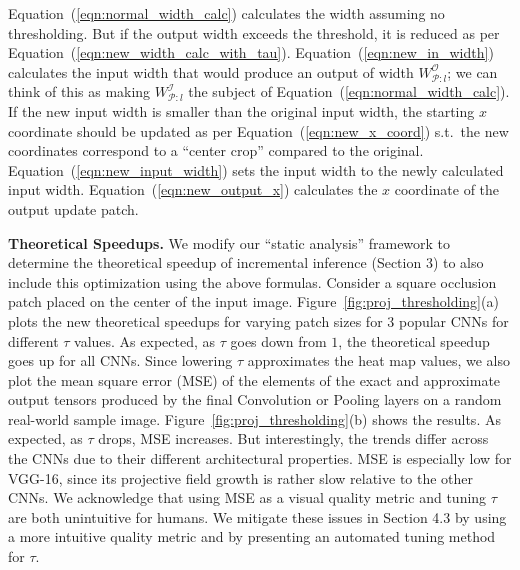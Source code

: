 Equation~(\ref{eqn:normal_width_calc}) calculates the width assuming no thresholding. But if the output width exceeds the threshold, it is reduced as per Equation~(\ref{eqn:new_width_calc_with_tau}). Equation~(\ref{eqn:new_in_width}) calculates the input width that would produce an output of width $W^\mathcal{O}_{\mathcal{P}:l}$; we can think of this as making $W^{\mathcal{I}}_{\mathcal{P}:l}$ the subject of Equation~(\ref{eqn:normal_width_calc}). If the new input width is smaller than the original input width, the starting $x$ coordinate should be updated as per Equation~(\ref{eqn:new_x_coord}) s.t.~the new coordinates correspond to a ``center crop'' compared to the original. Equation~(\ref{eqn:new_input_width}) sets the input width to the newly calculated input width. Equation~(\ref{eqn:new_output_x}) calculates the $x$ coordinate of the output update patch.

\vspace{2mm}
\noindent \textbf{Theoretical Speedups.}
We modify our ``static analysis'' framework to determine the theoretical speedup of incremental inference (Section 3) to also include this optimization using the above formulas. Consider a square occlusion patch placed on the center of the input image. Figure~\ref{fig:proj_thresholding}(a) plots the new theoretical speedups for varying patch sizes for 3 popular CNNs for different $\tau$ values.
As expected, as $\tau$ goes down from $1$, the theoretical speedup goes up for all CNNs. Since lowering $\tau$ approximates the heat map values, we also plot the mean square error (MSE) of the elements of the exact and approximate output tensors produced by the final Convolution or Pooling layers on a random real-world sample image. Figure~\ref{fig:proj_thresholding}(b) shows the results. As expected, as $\tau$ drops, MSE increases. But interestingly, the trends differ across the CNNs due to their different architectural properties. MSE is especially low for VGG-16, since its projective field growth is rather slow relative to the other CNNs. We acknowledge that using MSE as a visual quality metric and tuning $\tau$ are both unintuitive for humans. We mitigate these issues in Section 4.3 by using a more intuitive quality metric and by presenting an automated tuning method for $\tau$.


